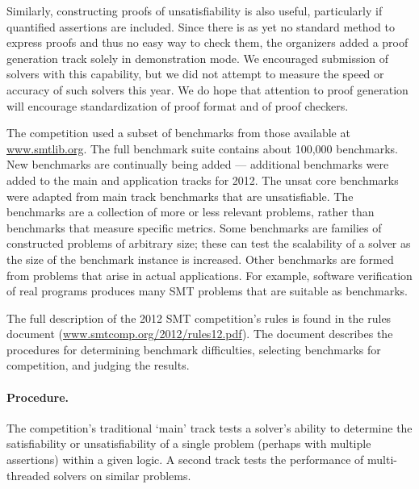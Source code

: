 \documentclass{llncs}
\begin{document}
Similarly, constructing proofs of unsatisfiability is also useful, particularly if quantified assertions are included.
Since there is as yet no standard method to express proofs and thus no easy way to check them, the organizers added a proof generation track solely in demonstration mode. We encouraged submission of solvers with this capability, but we did not attempt to measure the speed or accuracy of such solvers this year. We do hope that
attention to proof generation will encourage standardization of proof format and of proof checkers.

The competition used a subset of benchmarks from those available at \url{www.smtlib.org}. The full benchmark suite contains about 100,000 benchmarks. New benchmarks are continually being added --- additional benchmarks were added to the main and application tracks for 2012. The unsat core benchmarks were adapted from main track benchmarks that are unsatisfiable. The benchmarks are a collection of more or less relevant problems, rather than benchmarks that measure specific metrics.
Some benchmarks are families of constructed problems of arbitrary size; these can test the scalability of a solver as
the size of the benchmark instance is increased. Other benchmarks are formed from problems that arise in actual 
applications. For example, software verification of real programs produces many SMT problems that are suitable as benchmarks.

The full description of the 2012 SMT competition's rules is found in the rules document (\url{www.smtcomp.org/2012/rules12.pdf}). The document describes the procedures for determining benchmark difficulties, selecting benchmarks for competition, and judging the results.

\paragraph{Procedure.} 

The competition's traditional `main' track tests a solver's ability to determine the satisfiability or unsatisfiability of a single problem (perhaps with multiple assertions) within a given logic. A second track tests the performance of multi-threaded solvers on similar problems.
\end{document}
